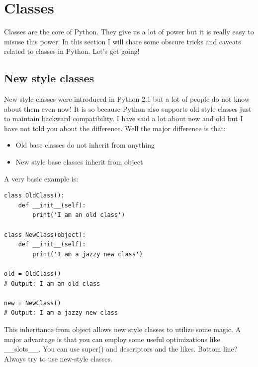 \documentclass{report}
\begin{document}
    \pagebreak \bigbreak \noindent 
    \section{Classes}
    \bigbreak \noindent 
    Classes are the core of Python. They give us a lot of power but it is really easy to misuse this power. In this section I will share some obscure tricks and caveats related to classes in Python. Let’s get going!

    \bigbreak \noindent \bigbreak \noindent 
    \subsection{New style classes}
    \bigbreak \noindent 
    New style classes were introduced in Python 2.1 but a lot of people do not know about them even now! It is so because Python also supports old style classes just to maintain backward compatibility. I have said a lot about new and old but I have not told you about the difference. Well the major difference is that:
    \bigbreak \noindent 

    \begin{itemize}
        \item Old base classes do not inherit from anything
        \item New style base classes inherit from object
    \end{itemize}
    A very basic example is:
    \begin{verbatim}
class OldClass():
    def __init__(self):
        print('I am an old class')

class NewClass(object):
    def __init__(self):
        print('I am a jazzy new class')

old = OldClass()
# Output: I am an old class

new = NewClass()
# Output: I am a jazzy new class
    \end{verbatim}
    This inheritance from object allows new style classes to utilize some magic. A major advantage is that you can employ some useful optimizations like \_\_slots\_\_. You can use super() and descriptors and the likes. Bottom line? Always try to use new-style classes.
    \bigbreak \noindent 


    \pagebreak \bigbreak \noindent
\end{document}

